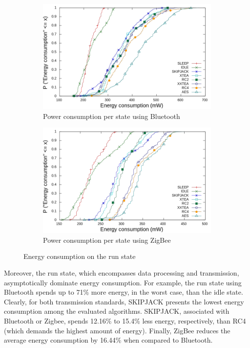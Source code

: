 \begin{figure}[!t]
\centering
  \begin{subfigure}[b]{0.4\textwidth}
    \includegraphics[width=\textwidth]{Figures/cdf_blue_aes.png}
    \caption{Power consumption per state using Bluetooth}
    \label{fig:cdf_blue}
  \end{subfigure}
  \begin{subfigure}[b]{0.4\textwidth}
    \includegraphics[width=\textwidth]{Figures/cdf_zig_aes.png}
    \caption{Power consumption per state using ZigBee}
    \label{fig:cdf_zig}
  \end{subfigure}
  \caption{Energy consumption on the run state}
  \vspace{-0.3cm}
\end{figure}

Moreover, the run state, which encompasses data processing and transmission, asymptotically dominate energy consumption.  
For example, the run state using Bluetooth spends up to 71\% more energy, in the worst case, than the idle state. Clearly, for both transmission standards, SKIPJACK presents the lowest energy consumption among the evaluated algorithms. SKIPJACK, associated with Bluetooth or Zigbee, spends 12.16\% to 15.4\% less energy, respectively, than RC4 (which demands the highest amount of energy). Finally, ZigBee reduces the average energy consumption by 16.44\% when compared to Bluetooth.


